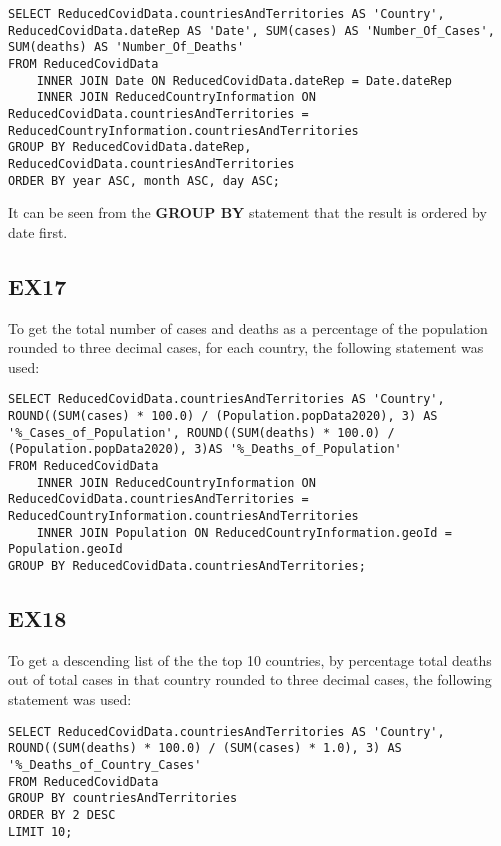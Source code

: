 \documentclass{article}
\begin{document}
\begin{lstlisting}[caption={Querying number of cases and deaths for all countries by increasing date}]
SELECT ReducedCovidData.countriesAndTerritories AS 'Country', ReducedCovidData.dateRep AS 'Date', SUM(cases) AS 'Number_Of_Cases', SUM(deaths) AS 'Number_Of_Deaths'
FROM ReducedCovidData
	INNER JOIN Date ON ReducedCovidData.dateRep = Date.dateRep
	INNER JOIN ReducedCountryInformation ON ReducedCovidData.countriesAndTerritories = ReducedCountryInformation.countriesAndTerritories
GROUP BY ReducedCovidData.dateRep, ReducedCovidData.countriesAndTerritories
ORDER BY year ASC, month ASC, day ASC;
\end{lstlisting}

It can be seen from the \textbf{GROUP BY} statement that the result is ordered by date first.

\subsection{EX17}

To get the total number of cases and deaths as a percentage of the population rounded to three decimal cases, for each country, the following statement was used:

\begin{lstlisting}[caption={Querying total number of cases and deaths of a country(percentage of population)}]
SELECT ReducedCovidData.countriesAndTerritories AS 'Country', ROUND((SUM(cases) * 100.0) / (Population.popData2020), 3) AS '%_Cases_of_Population', ROUND((SUM(deaths) * 100.0) / (Population.popData2020), 3)AS '%_Deaths_of_Population'
FROM ReducedCovidData
	INNER JOIN ReducedCountryInformation ON ReducedCovidData.countriesAndTerritories = ReducedCountryInformation.countriesAndTerritories
	INNER JOIN Population ON ReducedCountryInformation.geoId = Population.geoId
GROUP BY ReducedCovidData.countriesAndTerritories;
\end{lstlisting}

\subsection{EX18}

To get a descending list of the the top 10 countries, by percentage total deaths out of total cases in that country rounded to three decimal cases, the following statement was used:

\begin{lstlisting}[caption={Querying 10 countries with highest deaths to cases ratio percentage}]
SELECT ReducedCovidData.countriesAndTerritories AS 'Country', ROUND((SUM(deaths) * 100.0) / (SUM(cases) * 1.0), 3) AS '%_Deaths_of_Country_Cases'
FROM ReducedCovidData
GROUP BY countriesAndTerritories
ORDER BY 2 DESC
LIMIT 10;
\end{lstlisting}
\end{document}
